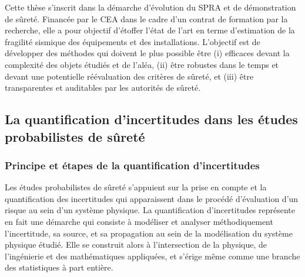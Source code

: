 
Cette thèse s'inscrit dans la démarche d'évolution du SPRA et de démonstration de sûreté. Financée par le CEA dans le cadre d'un contrat de formation par la recherche, elle a pour objectif d'étoffer l'état de l'art en terme d'estimation de la fragilité sismique des équipements et des installations.
L'objectif est de développer des méthodes qui doivent le plus possible être (i) efficaces devant la complexité des objets étudiés et de l'aléa, (ii) être robustes dans le temps et devant une potentielle réévaluation des critères de sûreté, et (iii) être transparentes et auditables par les autorités de sûreté.






\subsection{La quantification d'incertitudes dans les études probabilistes de sûreté} %


\subsubsection{Principe et étapes de la quantification d'incertitudes}


Les études probabilistes de sûreté %
s'appuient sur la 
prise en compte et la quantification des incertitudes qui apparaissent dans le procédé d'évaluation d'un risque au sein d'un système physique.
%
La quantification d'incertitudes représente en fait une démarche qui consiste à modéliser et analyser méthodiquement l'incertitude, sa source, et sa propagation au sein de la modélisation du système physique étudié. %
Elle se construit alors à l'intersection de la physique, de l'ingénierie et des mathématiques appliquées, et s'érige même comme une branche des statistiques à part entière.

